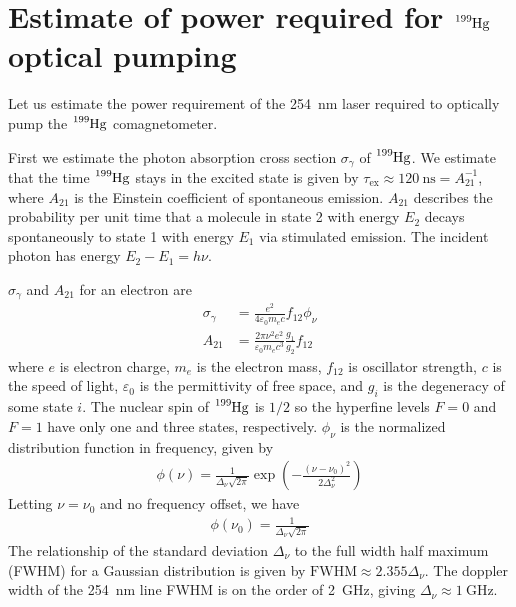 
\chapter{
    \texorpdfstring{Estimate of power required for $\ce{^{199}Hg}$ optical pumping}
    {Estimate of power required for 199Hg optical pumping}\label{appx:199hg_pumping}
}


Let us estimate the power requirement of the \qty{254}{\nano\meter} laser required to optically pump the $\ce{^199Hg}$ comagnetometer.

First we estimate the photon absorption cross section $\sigma_\gamma$ of $\ce{^199Hg}$. We estimate that the time $\ce{^199Hg}$ stays in the excited state is given by $\tau_\text{ex}\approx \qty{120}{\nano\s}=A_{21}^{-1}$, where $A_{21}$ is the Einstein coefficient \cite{Hilborn1982} of spontaneous emission. $A_{21}$ describes the probability per unit time that a molecule in state 2 with energy $E_2$ decays spontaneously to state 1 with energy $E_1$ via stimulated emission. The incident photon has energy $E_2-E_1=h\nu$.

$\sigma_\gamma$ and $A_{21}$ for an electron are \cite{Hilborn1982}
%
\begin{align}
    \sigma_\gamma&=\frac{e^2}{4\varepsilon_0 m_e c}f_{12}\phi_\nu \label{eq:199hg_pumping_1}\\
    A_{21} &= \frac{2\pi \nu^2 e^2}{\varepsilon_0m_ec^3}\frac{g_1}{g_2}f_{12}\label{eq:199hg_pumping_2}
\end{align}
%
where $e$ is electron charge, $m_e$ is the electron mass, $f_{12}$ is oscillator strength, $c$ is the speed of light, $\varepsilon_0$ is the permittivity of free space, and $g_i$ is the degeneracy of some state $i$. The nuclear spin of $\ce{^199Hg}$ is $1/2$ so the hyperfine levels $F=0$ and $F=1$ have only one and three states, respectively. $\phi_\nu$ is the normalized distribution function in frequency, given by
%
\begin{gather}
    \phi(\nu)=\frac{1}{\Delta_\nu \sqrt{2\pi}}\exp \left( - \frac{(\nu-\nu_0)^2}{2\Delta^2_\nu}\right)
\end{gather}
%
Letting $\nu=\nu_0$ and no frequency offset, we have
%
\begin{gather}
    \phi(\nu_0)=\frac{1}{\Delta_\nu\sqrt{2\pi}}\label{eq:199hg_pumping_3}
\end{gather}
%
The relationship of the standard deviation $\Delta_\nu$ to the full width half maximum (FWHM) for a Gaussian distribution is given by $\text{FWHM}\approx 2.355\Delta_\nu$. The doppler width of the \qty{254}{\nano\meter} line FWHM is on the order of \qty{2}{\giga\Hz}, giving $\Delta_\nu\approx \qty{1}{\giga\Hz}$.

